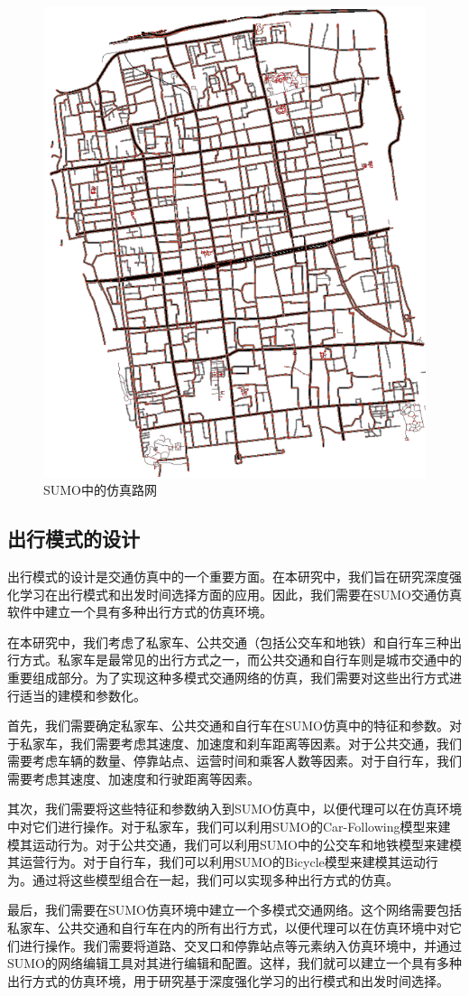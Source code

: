 \begin{figure}[htbp]
  \centering
  \includegraphics[width=.5\linewidth]{figures/content/suzhousumo.png}
  \caption{SUMO中的仿真路网}
  \label{suzhousumo}
\end{figure}

\subsection{出行模式的设计}

出行模式的设计是交通仿真中的一个重要方面。在本研究中，我们旨在研究深度强化学习在出行模式和出发时间选择方面的应用。因此，我们需要在SUMO交通仿真软件中建立一个具有多种出行方式的仿真环境。

在本研究中，我们考虑了私家车、公共交通（包括公交车和地铁）和自行车三种出行方式。私家车是最常见的出行方式之一，而公共交通和自行车则是城市交通中的重要组成部分。为了实现这种多模式交通网络的仿真，我们需要对这些出行方式进行适当的建模和参数化。

首先，我们需要确定私家车、公共交通和自行车在SUMO仿真中的特征和参数。对于私家车，我们需要考虑其速度、加速度和刹车距离等因素。对于公共交通，我们需要考虑车辆的数量、停靠站点、运营时间和乘客人数等因素。对于自行车，我们需要考虑其速度、加速度和行驶距离等因素。

其次，我们需要将这些特征和参数纳入到SUMO仿真中，以便代理可以在仿真环境中对它们进行操作。对于私家车，我们可以利用SUMO的Car-Following模型来建模其运动行为。对于公共交通，我们可以利用SUMO中的公交车和地铁模型来建模其运营行为。对于自行车，我们可以利用SUMO的Bicycle模型来建模其运动行为。通过将这些模型组合在一起，我们可以实现多种出行方式的仿真。

最后，我们需要在SUMO仿真环境中建立一个多模式交通网络。这个网络需要包括私家车、公共交通和自行车在内的所有出行方式，以便代理可以在仿真环境中对它们进行操作。我们需要将道路、交叉口和停靠站点等元素纳入仿真环境中，并通过SUMO的网络编辑工具对其进行编辑和配置。这样，我们就可以建立一个具有多种出行方式的仿真环境，用于研究基于深度强化学习的出行模式和出发时间选择。

